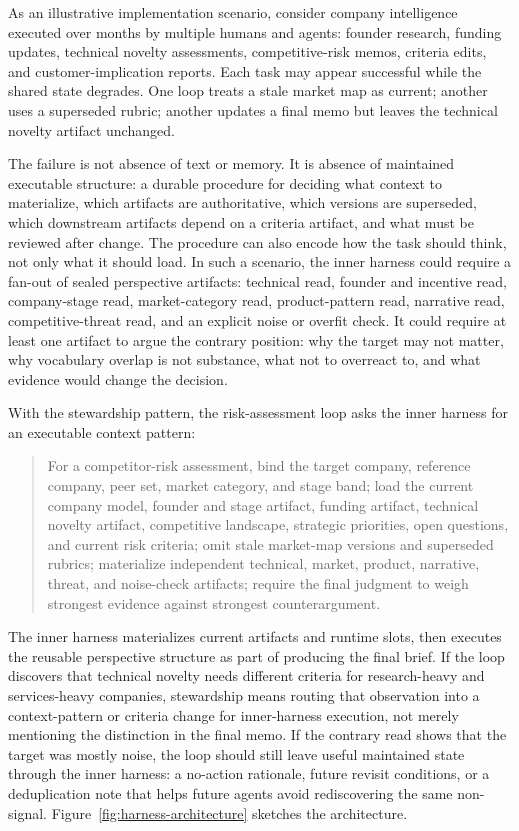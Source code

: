 \documentclass{article}
\begin{document}
As an illustrative implementation scenario, consider company intelligence executed over months by multiple humans and agents: founder research, funding updates, technical novelty assessments, competitive-risk memos, criteria edits, and customer-implication reports. Each task may appear successful while the shared state degrades. One loop treats a stale market map as current; another uses a superseded rubric; another updates a final memo but leaves the technical novelty artifact unchanged.

The failure is not absence of text or memory. It is absence of maintained executable structure: a durable procedure for deciding what context to materialize, which artifacts are authoritative, which versions are superseded, which downstream artifacts depend on a criteria artifact, and what must be reviewed after change. The procedure can also encode how the task should think, not only what it should load. In such a scenario, the inner harness could require a fan-out of sealed perspective artifacts: technical read, founder and incentive read, company-stage read, market-category read, product-pattern read, narrative read, competitive-threat read, and an explicit noise or overfit check. It could require at least one artifact to argue the contrary position: why the target may not matter, why vocabulary overlap is not substance, what not to overreact to, and what evidence would change the decision.

With the stewardship pattern, the risk-assessment loop asks the inner harness for an executable context pattern:
\begin{quote}
For a competitor-risk assessment, bind the target company, reference company, peer set, market category, and stage band; load the current company model, founder and stage artifact, funding artifact, technical novelty artifact, competitive landscape, strategic priorities, open questions, and current risk criteria; omit stale market-map versions and superseded rubrics; materialize independent technical, market, product, narrative, threat, and noise-check artifacts; require the final judgment to weigh strongest evidence against strongest counterargument.
\end{quote}

The inner harness materializes current artifacts and runtime slots, then executes the reusable perspective structure as part of producing the final brief. If the loop discovers that technical novelty needs different criteria for research-heavy and services-heavy companies, stewardship means routing that observation into a context-pattern or criteria change for inner-harness execution, not merely mentioning the distinction in the final memo. If the contrary read shows that the target was mostly noise, the loop should still leave useful maintained state through the inner harness: a no-action rationale, future revisit conditions, or a deduplication note that helps future agents avoid rediscovering the same non-signal. Figure~\ref{fig:harness-architecture} sketches the architecture.
\end{document}
